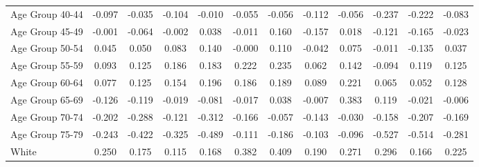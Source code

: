 \begin{table}[htbp]
\begin{tabular}{l*{11}{c}}
Age Group 40-44     &      -0.097         &      -0.035         &      -0.104         &      -0.010         &      -0.055         &      -0.056         &      -0.112         &      -0.056         &      -0.237\sym{*}  &      -0.222         &      -0.083\sym{*}  \\
Age Group 45-49     &      -0.001         &      -0.064         &      -0.002         &       0.038         &      -0.011         &       0.160         &      -0.157         &       0.018         &      -0.121         &      -0.165         &      -0.023         \\
Age Group 50-54     &       0.045         &       0.050         &       0.083         &       0.140         &      -0.000         &       0.110         &      -0.042         &       0.075         &      -0.011         &      -0.135         &       0.037         \\
Age Group 55-59     &       0.093         &       0.125         &       0.186         &       0.183         &       0.222         &       0.235         &       0.062         &       0.142         &      -0.094         &       0.119         &       0.125\sym{**} \\
Age Group 60-64     &       0.077         &       0.125         &       0.154         &       0.196\sym{*}  &       0.186         &       0.189         &       0.089         &       0.221         &       0.065         &       0.052         &       0.128\sym{***}\\
Age Group 65-69     &      -0.126         &      -0.119         &      -0.019         &      -0.081         &      -0.017         &       0.038         &      -0.007         &       0.383\sym{**} &       0.119         &      -0.021         &      -0.006         \\
Age Group 70-74     &      -0.202         &      -0.288\sym{**} &      -0.121         &      -0.312\sym{**} &      -0.166         &      -0.057         &      -0.143         &      -0.030         &      -0.158         &      -0.207         &      -0.169\sym{***}\\
Age Group 75-79     &      -0.243\sym{*}  &      -0.422\sym{***}&      -0.325\sym{**} &      -0.489\sym{***}&      -0.111         &      -0.186         &      -0.103         &      -0.096         &      -0.527\sym{***}&      -0.514\sym{***}&      -0.281\sym{***}\\
White               &       0.250\sym{*}  &       0.175\sym{*}  &       0.115         &       0.168\sym{*}  &       0.382\sym{***}&       0.409\sym{***}&       0.190         &       0.271\sym{*}  &       0.296\sym{**} &       0.166         &       0.225\sym{***}\\

\end{tabular}
\end{table}
